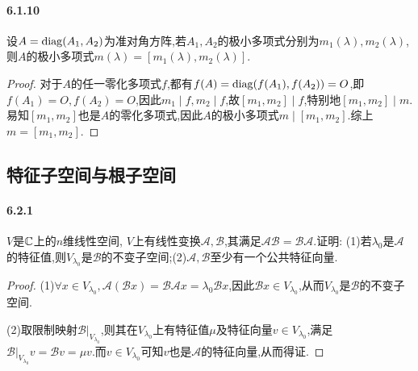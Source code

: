 \documentclass[11pt]{article}
\begin{document}
\paragraph{6.1.10}设$A=\operatorname{diag}(A_1,A_2)$为准对角方阵,若$A_1,A_2$的极小多项式分别为$m_1(\lambda), m_2(\lambda)$, 则$A$的极小多项式$m(\lambda)=[m_1(\lambda),m_2(\lambda)]$.
\begin{proof}
    对于$A$的任一零化多项式$f$,都有$f(A)=\operatorname{diag}(f(A_1),f(A_2))=O$,即$f(A_1)=O, f(A_2)=O$,因此$m_1\mid f, m_2\mid f$,故$[m_1,m_2]\mid f$,特别地$[m_1,m_2]\mid m$.易知$[m_1,m_2]$也是$A$的零化多项式,因此$A$的极小多项式$m\mid [m_1,m_2]$.综上$m=[m_1,m_2]$.
\end{proof}

\subsection{特征子空间与根子空间}
\paragraph{6.2.1}$V$是$\mathbb{C}$上的$n$维线性空间, $V$上有线性变换$\mathscr{A,B}$,其满足$\mathscr{AB}=\mathscr{BA}$.证明: (1)若$\lambda_0$是$\mathscr{A}$的特征值,则$V_{\lambda_0}$是$\mathscr{B}$的不变子空间;(2)$\mathscr{A,B}$至少有一个公共特征向量.
\begin{proof}
    (1)$\forall x\in V_{\lambda_0}, \mathscr{A}(\mathscr{B}x)=\mathscr{BA} x=\lambda_0\mathscr{B}x$,因此$\mathscr{B}x\in V_{\lambda_0}$,从而$V_{\lambda_0}$是$\mathscr{B}$的不变子空间.

    (2)取限制映射$\mathscr{B}|_{V_{\lambda_0}}$,则其在$V_{\lambda_0}$上有特征值$\mu$及特征向量$v\in V_{\lambda_0}$,满足$\mathscr{B}|_{V_{\lambda_0}}v=\mathscr{B}v=\mu v$.而$v\in V_{\lambda_0}$可知$v$也是$\mathscr{A}$的特征向量,从而得证.
\end{proof}
\end{document}
